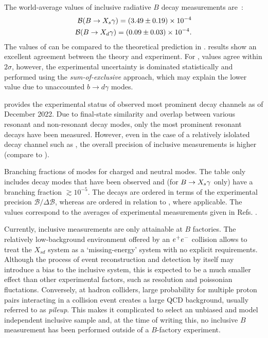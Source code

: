 The world-average values of inclusive radiative $B$ decay measurements are~\cite{Amhis:2022mac,Workman:2022ynf}:
\begin{align}\label{eq:btosgamma_experimental}
    \begin{split}
    \mathcal{B}(\BtoXsgamma)=(3.49\pm 0.19)\times10^{-4}\\
    \mathcal{B}(\BtoXdgamma)=(0.09\pm 0.03)\times10^{-4}.
    \end{split}
\end{align}
The values of  can be compared to the theoretical prediction in .
\BtoXsgamma results show an excellent agreement between the theory and experiment.
For \BtoXdgamma, values agree within $2\sigma$, however, the experimental uncertainty is dominated statistically and performed using the \textit{sum-of-exclusive} approach, which may explain the lower value due to unaccounted $b\rightarrow d\gamma$ modes.

 provides the experimental status of observed most prominent \BtoXsdgamma decay channels as of December 2022.
Due to final-state similarity and overlap between various resonant and non-resonant decay modes, only the most prominent resonant decays have been measured.
However, even in the case of a relatively islolated decay channel such as \BtoKstargamma, the overall precision of inclusive measurements is higher (compare to ).

{\renewcommand{\arraystretch}{1.2}
\begin{table}[!htbp]
    \centering
    \caption{\label{tab:btosgamma_bfs} 
    Branching fractions of \BtoXsgamma modes for charged and neutral modes.
    The table only includes decay modes that have been observed and (for $\BtoXsgamma$ only) have a branching fraction $\gtrsim10^{-5}$.
    The \Bp decays are ordered in terms of the experimental precision $\mathcal{B}/\Delta\mathcal{B}$, whereas \Bz are ordered in relation to \Bp, where applicable.
    The values correspond to the averages of experimental measurements given in Refs. \cite{Amhis:2022mac,Workman:2022ynf}.
    }
    
\end{table}
}

Currently, inclusive measurements are only attainable at $B$ factories.
The relatively low-background environment offered by an $e^+e^-$ collision allows to treat the $X_{sd}$ system as a `missing-energy' system with no explicit requirements.
Although the process of event reconstruction and detection by itself may introduce a bias to the inclusive system, this is expected to be a much smaller effect than other experimental factors, such as resolution and poissonian fluctations.
Conversely, at hadron colliders, large probability for multiple proton pairs interacting in a collision event creates a large QCD background, usually referred to as \textit{pileup}.
This makes it complicated to select an unbiased and model independent inclusive sample and,
at the time of writing this, no inclusive $B$ measurement has been performed outside of a $B$-factory experiment.

